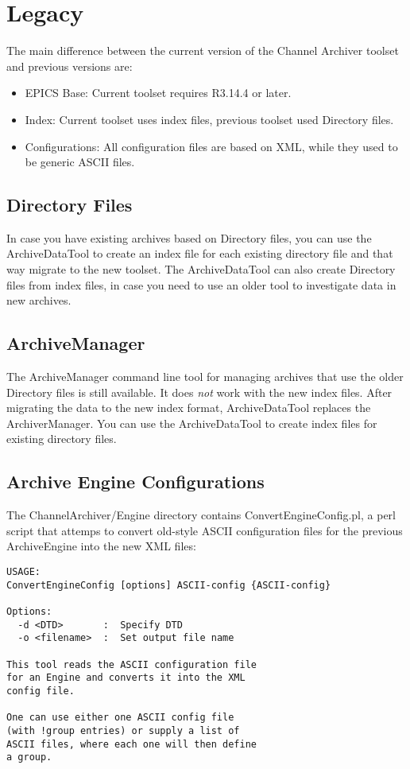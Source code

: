 \chapter{Legacy}
The main difference between the current version of the Channel Archiver toolset
and previous versions are:
\begin{itemize}
\item EPICS Base: Current toolset requires R3.14.4 or later.
\item Index: Current toolset uses index files, previous toolset
      used Directory files.
\item Configurations: All configuration files are based on XML,
      while they used to be generic ASCII files.
\end{itemize}

\section{Directory Files}
In case you have existing archives based on Directory files,
you can use the ArchiveDataTool to create an index file for each existing directory file
and that way migrate to the new toolset.
The ArchiveDataTool can also create Directory files from index files, in case you
need to use an older tool to investigate data in new archives.

\section{ArchiveManager}
The ArchiveManager command line tool for managing archives that use the
older Directory files is still available.
It does \emph{not} work with the new index files.
After migrating the data to the new index format,
ArchiveDataTool replaces the ArchiverManager. You can use the ArchiveDataTool
to create index files for existing directory files.

\section{Archive Engine Configurations}
The ChannelArchiver/Engine directory contains ConvertEngineConfig.pl,
a perl script that attemps to convert old-style ASCII configuration
files for the previous ArchiveEngine into the new XML files:
\begin{lstlisting}[keywordstyle=\sffamily]
USAGE:
ConvertEngineConfig [options] ASCII-config {ASCII-config}
 
Options:
  -d <DTD>       :  Specify DTD
  -o <filename>  :  Set output file name
 
This tool reads the ASCII configuration file
for an Engine and converts it into the XML
config file.
 
One can use either one ASCII config file
(with !group entries) or supply a list of
ASCII files, where each one will then define
a group.
\end{lstlisting}

